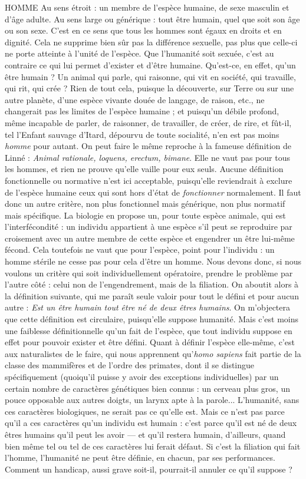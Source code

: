 HOMME Au sens étroit : un membre de l'espèce humaine, de sexe masculin
et d’âge adulte. Au sens large ou générique : tout être humain,
quel que soit son âge ou son sexe. C’est en ce sens que tous les hommes sont
égaux en droits et en dignité. Cela ne supprime bien sûr pas la différence
sexuelle, pas plus que celle-ci ne porte atteinte à l’unité de l’espèce. Que
l'humanité soit sexuée, c’est au contraire ce qui lui permet d’exister et d’être
humaine. Qu'est-ce, en effet, qu’un être humain ? Un animal qui parle, qui raisonne,
qui vit en société, qui travaille, qui rit, qui crée ? Rien de tout cela,
puisque la découverte, sur Terre ou sur une autre planète, d’une espèce vivante
douée de langage, de raison, etc., ne changerait pas les limites de l’espèce
humaine ; et puisqu’un débile profond, même incapable de parler, de raisonner,
de travailler, de créer, de rire, et fût-il, tel l'Enfant sauvage d’Itard,
dépourvu de toute socialité, n’en est pas moins {\it homme} pour autant. On peut
faire le même reproche à la fameuse définition de Linné : {\it Animal rationale,
loquens, erectum, bimane}. Elle ne vaut pas pour tous les hommes, et rien ne
prouve qu’elle vaille pour eux seuls. Aucune définition fonctionnelle ou normative
n’est ici acceptable, puisqu’elle reviendrait à exclure de l’espèce humaine
ceux qui sont hors d’état de {\it fonctionner} normalement. Il faut donc un autre critère,
non plus fonctionnel mais générique, non plus normatif mais spécifique.
La biologie en propose un, pour toute espèce animale, qui est l’interfécondité :
un individu appartient à une espèce s’il peut se reproduire par croisement avec
un autre membre de cette espèce et engendrer un être lui-même fécond. Cela
toutefois ne vaut que pour l'espèce, point pour l’individu : un homme stérile
ne cesse pas pour cela d’être un homme. Nous devons donc, si nous voulons un
critère qui soit individuellement opératoire, prendre le problème par l’autre
côté : celui non de l’engendrement, mais de la filiation. On aboutit alors à la
définition suivante, qui me paraît seule valoir pour tout le défini et pour aucun
autre : {\it Est un être humain tout être né de deux êtres humains}. On m’objectera
que cette définition est circulaire, puisqu’elle suppose humanité. Mais c’est
moins une faiblesse définitionnelle qu’un fait de l'espèce, que tout individu
suppose en effet pour pouvoir exister et être défini. Quant à définir l'espèce
elle-même, c’est aux naturalistes de le faire, qui nous apprennent qu’{\it homo
sapiens} fait partie de la classe des mammifères et de l’ordre des primates, dont il
se distingue spécifiquement (quoiqu'il puisse y avoir des exceptions individuelles)
par un certain nombre de caractères génétiques bien connus : un cerveau
plus gros, un pouce opposable aux autres doigts, un larynx apte à la
parole... L’humanité, sans ces caractères biologiques, ne serait pas ce qu’elle
est. Mais ce n’est pas parce qu’il a ces caractères qu’un individu est humain :
c’est parce qu’il est né de deux êtres humains qu’il peut les avoir — et qu’il restera
humain, d’ailleurs, quand bien même tel ou tel de ces caractères lui ferait
défaut. Si c’est la filiation qui fait l’homme, l’humanité ne peut être définie, en
chacun, par ses performances. Comment un handicap, aussi grave soit-il, pourrait-il
annuler ce qu’il suppose ?


